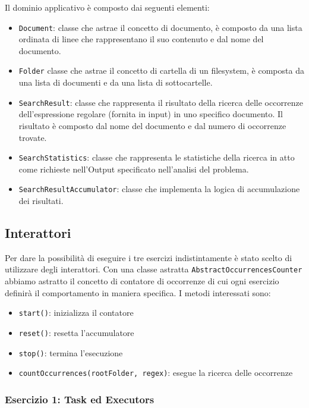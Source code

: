﻿\documentclass[a4paper]{article}
\begin{document}
Il dominio applicativo \`e composto dai seguenti elementi:

\begin{itemize}
%
    \item \texttt{Document}: classe che astrae il concetto di documento, \`e composto da una lista ordinata di linee che rappresentano il suo contenuto e dal nome del documento.
%
    \item \texttt{Folder} classe che astrae il concetto di cartella di un filesystem, \`e composta da una lista di documenti e da una lista di sottocartelle.
%
    \item \texttt{SearchResult}: classe che rappresenta il risultato della ricerca delle occorrenze dell'espressione regolare (fornita in input) in uno specifico documento.
%
    Il risultato \`e composto dal nome del documento e dal numero di occorrenze trovate.
%
    \item \texttt{SearchStatistics}: classe che rappresenta le statistiche della ricerca in atto come richieste nell'Output specificato nell'analisi del problema.
%
    \item \texttt{SearchResultAccumulator}: classe che implementa la logica di accumulazione dei risultati.
%
\end{itemize}

\subsection{Interattori}
Per dare la possibilità di eseguire i tre esercizi indistintamente è stato scelto di utilizzare degli interattori. Con una classe astratta \texttt{AbstractOccurrencesCounter} abbiamo astratto il concetto di contatore di occorrenze di cui ogni esercizio definirà il comportamento in maniera specifica.
I metodi interessati sono:
\begin{itemize}
    \item \texttt{start()}: inizializza il contatore 
    \item \texttt{reset()}: resetta l'accumulatore
    \item \texttt{stop()}: termina l'esecuzione
    \item \texttt{countOccurrences(rootFolder, regex)}: esegue la ricerca delle occorrenze
\end{itemize}

\subsubsection{Esercizio 1: Task ed Executors}
\end{document}
